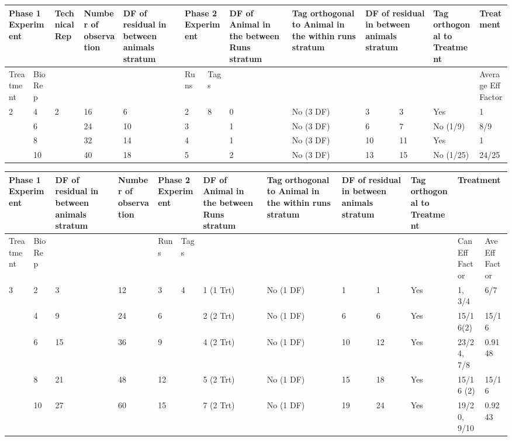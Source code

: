 \begin{tabular}{|p{0.5in}|p{0.4in}|p{0.5in}|p{0.7in}|p{0.7in}|p{0.3in}|p{0.3in}|p{0.7in}|p{0.7in}|p{0.2in}|p{0.4in}|p{0.6in}|p{0.6in}|} \hline 
\multicolumn{2}{|p{1in}|}{Phase 1 Experiment} & Technical Rep & Number of observation  & DF of residual in between animals stratum & \multicolumn{2}{|p{0.7in}|}{Phase 2 Experiment} & DF of Animal in the between Runs stratum  & Tag orthogonal to Animal in the within runs stratum & \multicolumn{2}{|p{0.6in}|}{DF of residual in between animals stratum} & Tag orthogonal to Treatment & Treatment \\ \hline 
Treatment & Bio Rep &  &  &  & Runs & Tags  &  &  & \multicolumn{2}{|p{0.6in}|}{} &  & Average Eff Factor \\ \hline 
2 & 4 & 2 & 16 & 6 & 2 & 8\newline \newline  & 0 & No (3 DF) & 3 & 3 & Yes & 1 \\ \hline 
 & 6 &  & 24 & 10 & 3 &  & 1 & No (3 DF) & 6 & 7 & No (1/9) & 8/9 \\ \hline 
 & 8 &  & 32 & 14 & 4 &  & 1 & No (3 DF) & 10 & 11 & Yes & 1 \\ \hline 
 & 10 &  & 40 & 18 & 5 &  & 2 & No (3 DF) & 13 & 15 & No (1/25) & 24/25 \\ \hline 
\end{tabular}



\noindent  

\noindent \eject 

\begin{tabular}{|p{0.5in}|p{0.3in}|p{0.5in}|p{0.7in}|p{0.3in}|p{0.3in}|p{0.7in}|p{0.7in}|p{0.2in}|p{0.4in}|p{0.6in}|p{0.5in}|p{0.4in}|} \hline 
\multicolumn{2}{|p{1in}|}{Phase 1 Experiment} & DF of residual in between animals stratum & Number of observation  & \multicolumn{2}{|p{0.7in}|}{Phase 2 Experiment} & DF of Animal in the between Runs stratum  & Tag orthogonal to Animal in the within runs stratum & \multicolumn{2}{|p{0.6in}|}{DF of residual in between animals stratum} & Tag orthogonal to Treatment & \multicolumn{2}{|p{0.9in}|}{Treatment} \\ \hline 
Treatment & Bio Rep &  &  & Runs & Tags  &  &  & \multicolumn{2}{|p{0.6in}|}{} &  & Can Eff Factor & Ave Eff Factor \\ \hline 
3 & 2 & 3 & 12 & 3 & 4 & 1 (1 Trt)  & No (1 DF) & 1 & 1 & Yes & 1,  3/4 & 6/7 \\ \hline 
 & 4 & 9 & 24 & 6 &  & 2 (2 Trt) & No (1 DF) & 6 & 6 & Yes & 15/16(2) & 15/16 \\ \hline 
 & 6 & 15 & 36 & 9 &  & 4 (2 Trt) & No (1 DF) & 10 & 12 & Yes & 23/24,   7/8 & 0.9148 \\ \hline 
 & 8 & 21 & 48 & 12 &  & 5 (2 Trt) & No (1 DF) & 15 & 18 & Yes & 15/16 (2) & 15/16 \\ \hline 
 & 10 & 27 & 60 & 15 &  & 7 (2 Trt) & No (1 DF) & 19 & 24 & Yes & 19/20,  9/10 & 0.9243 \\ \hline 
\end{tabular}



